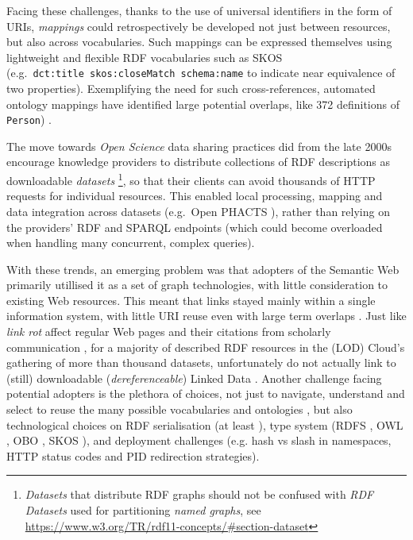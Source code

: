 Facing these challenges, thanks to the use of universal identifiers in the form of URIs, \emph{mappings} could retrospectively be developed not just between resources, but also across vocabularies. Such mappings can be expressed themselves using lightweight and flexible RDF vocabularies such as SKOS \cite{w3-skos-primer} (e.g.~\texttt{dct:title\ skos:closeMatch\ schema:name} to indicate near equivalence of two properties). Exemplifying the need for such cross-references, automated ontology mappings have identified large potential overlaps, like 372 definitions of \texttt{Person}) \cite{huHowMatchableAre2011a}.

The move towards \emph{Open Science} data sharing practices did from the late 2000s encourage knowledge providers to distribute collections of RDF descriptions as downloadable \emph{datasets} \footnote{\emph{Datasets} that distribute RDF graphs should not be confused with \emph{RDF Datasets} used for partitioning \emph{named graphs}, see \url{https://www.w3.org/TR/rdf11-concepts/\#section-dataset}}, so that their clients can avoid thousands of HTTP requests for individual resources. This enabled local processing, mapping and data integration across datasets (e.g.~Open PHACTS \cite{grothAPIcentricLinkedData2014b}), rather than relying on the providers' RDF and SPARQL endpoints (which could become overloaded when handling many concurrent, complex queries).

With these trends, an emerging problem was that adopters of the Semantic Web primarily utillised it as a set of graph technologies, with little consideration to existing Web resources. This meant that links stayed mainly within a single information system, with little URI reuse even with large term overlaps \cite{kamdarSystematicAnalysisTerm2017a}. Just like \emph{link rot} affect regular Web pages and their citations from scholarly communication \cite{kleinScholarlyContextNot2014a}, for a majority of described RDF resources in the  (LOD) Cloud's gathering of more than thousand datasets, unfortunately do not actually link to (still) downloadable (\emph{dereferenceable}) Linked Data \cite{polleresMoreDecentralizedVision2020a}. Another challenge facing potential adopters is the plethora of choices, not just to navigate, understand and select to reuse the many possible vocabularies and ontologies \cite{carrieroLandscapeOntologyReuse2020a}, but also technological choices on RDF serialisation (at least ), type system (RDFS \cite{w3-rdf-schema}, OWL \cite{w3-owl2-overview}, OBO \cite{tirmiziMappingOBOOWL2011a}, SKOS \cite{w3-skos-primer}), and deployment challenges \cite{sauermannCoolURIsSemantic2011} (e.g. hash vs slash in namespaces, HTTP status codes and PID redirection strategies).


